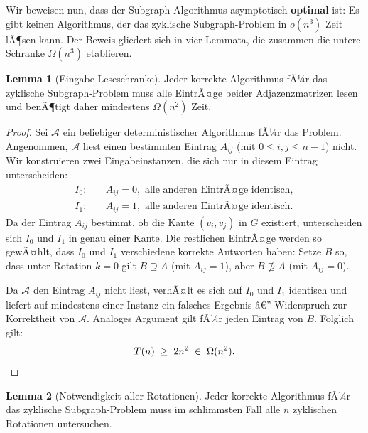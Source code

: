 ﻿\documentclass[a4paper,12pt]{article}
\theoremstyle{definition}
\newtheorem{lemma}{Lemma}
\begin{document}
Wir beweisen nun, dass der Subgraph Algorithmus asymptotisch \textbf{optimal} ist:
Es gibt keinen Algorithmus, der das zyklische Subgraph-Problem in $o(n^3)$ Zeit lÃ¶sen kann.
Der Beweis gliedert sich in vier Lemmata, die zusammen die untere Schranke $\Omega(n^3)$ etablieren.

\begin{lemma}[Eingabe-Leseschranke]
\label{lem:eingabe}
Jeder korrekte Algorithmus fÃ¼r das zyklische Subgraph-Problem muss alle EintrÃ¤ge beider Adjazenzmatrizen lesen und benÃ¶tigt daher mindestens $\Omega(n^2)$ Zeit.
\end{lemma}

\begin{proof}
Sei $\mathcal{A}$ ein beliebiger deterministischer Algorithmus fÃ¼r das Problem.
Angenommen, $\mathcal{A}$ liest einen bestimmten Eintrag $A_{ij}$ (mit $0 \le i, j \le n-1$) nicht.
Wir konstruieren zwei Eingabeinstanzen, die sich nur in diesem Eintrag unterscheiden:
\begin{align*}
	I_0: &\quad A_{ij} = 0, \text{ alle anderen EintrÃ¤ge identisch}, \\
	I_1: &\quad A_{ij} = 1, \text{ alle anderen EintrÃ¤ge identisch.}
\end{align*}
Da der Eintrag $A_{ij}$ bestimmt, ob die Kante $(v_i, v_j)$ in $G$ existiert, unterscheiden sich $I_0$ und $I_1$ in genau einer Kante.
Die restlichen EintrÃ¤ge werden so gewÃ¤hlt, dass $I_0$ und $I_1$ verschiedene korrekte Antworten haben:
Setze $B$ so, dass unter Rotation $k = 0$ gilt $B \supseteq A$ (mit $A_{ij} = 1$), aber $B \not\supseteq A$ (mit $A_{ij} = 0$).

Da $\mathcal{A}$ den Eintrag $A_{ij}$ nicht liest, verhÃ¤lt es sich auf $I_0$ und $I_1$ identisch und liefert auf mindestens einer Instanz ein falsches Ergebnis â€” Widerspruch zur Korrektheit von $\mathcal{A}$.
Analoges Argument gilt fÃ¼r jeden Eintrag von $B$.
Folglich gilt:
\[
	T(n) \;\geq\; 2n^2 \;\in\; \Omega(n^2). \qedhere
\]
\end{proof}

\begin{lemma}[Notwendigkeit aller Rotationen]
\label{lem:rotationen}
Jeder korrekte Algorithmus fÃ¼r das zyklische Subgraph-Problem muss im schlimmsten Fall alle $n$ zyklischen Rotationen untersuchen.
\end{lemma}
\end{document}
